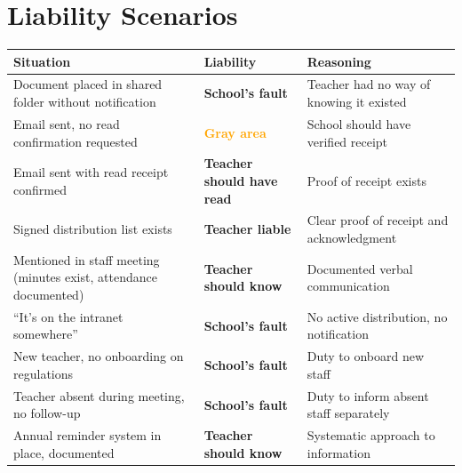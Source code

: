 \documentclass[11pt,a4paper]{article}
\begin{document}
\section{Liability Scenarios}

\begin{center}
\begin{longtable}{p{6cm}p{3cm}p{4.5cm}}
\toprule
\textbf{Situation} & \textbf{Liability} & \textbf{Reasoning} \\
\midrule
\endhead

Document placed in shared folder without notification &
\textcolor{warningred}{\textbf{School's fault}} &
Teacher had no way of knowing it existed \\[0.5em]

Email sent, no read confirmation requested &
\textcolor{orange}{\textbf{Gray area}} &
School should have verified receipt \\[0.5em]

Email sent with read receipt confirmed &
\textcolor{successgreen}{\textbf{Teacher should have read}} &
Proof of receipt exists \\[0.5em]

Signed distribution list exists &
\textcolor{successgreen}{\textbf{Teacher liable}} &
Clear proof of receipt and acknowledgment \\[0.5em]

Mentioned in staff meeting (minutes exist, attendance documented) &
\textcolor{successgreen}{\textbf{Teacher should know}} &
Documented verbal communication \\[0.5em]

``It's on the intranet somewhere'' &
\textcolor{warningred}{\textbf{School's fault}} &
No active distribution, no notification \\[0.5em]

New teacher, no onboarding on regulations &
\textcolor{warningred}{\textbf{School's fault}} &
Duty to onboard new staff \\[0.5em]

Teacher absent during meeting, no follow-up &
\textcolor{warningred}{\textbf{School's fault}} &
Duty to inform absent staff separately \\[0.5em]

Annual reminder system in place, documented &
\textcolor{successgreen}{\textbf{Teacher should know}} &
Systematic approach to information \\

\bottomrule
\end{longtable}
\end{center}
\end{document}
